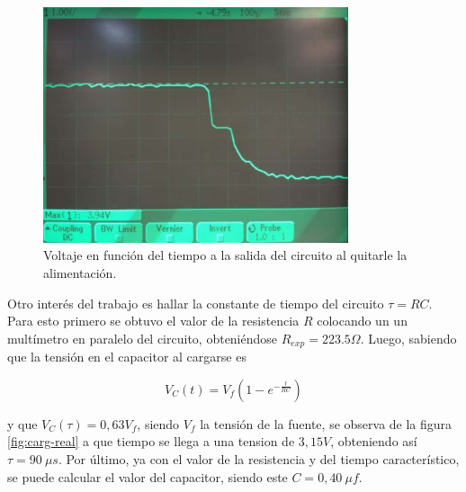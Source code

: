 \documentclass[a4paper]{article}
\begin{document}
\begin{figure}[H]
	\centering
	\includegraphics[width=0.8\textwidth]{Descarga-transitoria-real.jpeg}
	\caption{Voltaje en función del tiempo a la salida del circuito al quitarle la alimentación.}
	\label{fig:desc-real}
\end{figure}



Otro interés del trabajo es hallar la constante de tiempo del circuito $ \tau = RC $. Para esto primero se obtuvo el valor de la resistencia $ R $ colocando un un multímetro en paralelo del circuito, obteniéndose $ R_{exp} = 223.5 \Omega $.
Luego, sabiendo que la tensión en el capacitor al cargarse es

\begin{equation}
	V_{C} (t) = V_{f} \left( 1 - e^{- \frac{t}{RC}  } \right)
	\label{eq:carg-eq}
\end{equation}

y que $ V_{C} (\tau) = 0,63 V_{f} $, siendo $ V_{f} $ la tensión de la fuente, se observa de la figura \ref{fig:carg-real} a que tiempo se llega a una tension de $ 3,15 V $, obteniendo así $ \tau = 90\ \mu s $. Por último, ya con el valor de la resistencia y del tiempo característico, se puede calcular el valor del capacitor, siendo este $ C = 0,40\ \mu f $.

\end{document}
